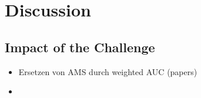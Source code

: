 \section{Discussion}\label{ch:disc}\raggedbottom
\pagebreak


\subsection{Impact of the Challenge}

\begin{itemize}
	\item Ersetzen von AMS durch weighted AUC (papers)
	\item
\end{itemize}

\cite{diaz14}
\cite{chen14}
\cite{HEPml}

	{\pagebreak \thispagestyle{empty} \cleardoublepage}{\clearpage}